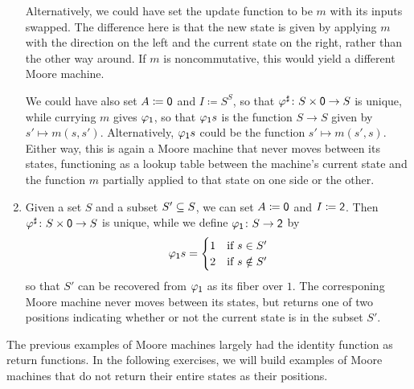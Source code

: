 \documentclass[Book-Poly]{subfiles}
\begin{document}
\begin{exercise}
\begin{solution}
\begin{enumerate}
  Alternatively, we could have set the update function to be $m$ with its inputs swapped.
  The difference here is that the new state is given by applying $m$ with the direction on the left and the current state on the right, rather than the other way around.
  If $m$ is noncommutative, this would yield a different Moore machine.

  We could have also set $A\coloneqq\0$ and $I\coloneqq S^S$, so that $\varphi^\sharp\colon S\times\0\to S$ is unique, while currying $m$ gives $\varphi_\1$, so that $\varphi_\1 s$ is the function $S \to S$ given by $s' \mapsto m(s, s')$.
  Alternatively, $\varphi_\1 s$ could be the function $s' \mapsto m(s', s)$.
  Either way, this is again a Moore machine that never moves between its states, functioning as a lookup table between the machine's current state and the function $m$ partially applied to that state on one side or the other.

  \item Given a set $S$ and a subset $S' \ss S$, we can set $A\coloneqq\0$ and $I\coloneqq\2$.
  Then $\varphi^\sharp\colon S\times\0\to S$ is unique, while we define $\varphi_\1\colon S\to\2$ by
  \[
      \varphi_\1 s =
      \begin{cases}
          1 & \text{if } s \in S' \\
          2 & \text{if } s \notin S'
      \end{cases}
  \]
  so that $S'$ can be recovered from $\varphi_\1$ as its fiber over $1$.
  The corresponing Moore machine never moves between its states, but returns one of two positions indicating whether or not the current state is in the subset $S'$.
\end{enumerate}
\end{solution}
\end{exercise}

The previous examples of Moore machines largely had the identity function as return functions.
In the following exercises, we will build examples of Moore machines that do not return their entire states as their positions.
\end{document}
